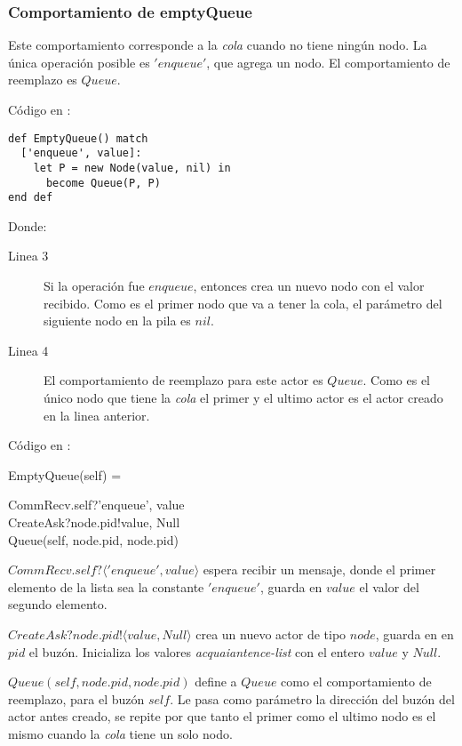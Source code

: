 \subsubsection*{Comportamiento de emptyQueue}
Este comportamiento corresponde a la \textit{cola} cuando no tiene ningún nodo. La única operación posible es $'enqueue'$, que agrega un nodo. El comportamiento de reemplazo es $Queue$.

Código en \SAL:

\begin{lstlisting}[language=sal, style=simple]
def EmptyQueue() match
  ['enqueue', value]:
    let P = new Node(value, nil) in
      become Queue(P, P)
end def
\end{lstlisting}

Donde:

\begin{description}
 \item [Linea 3] Si la operación fue $enqueue$, entonces crea un nuevo nodo con el valor recibido. Como es el primer nodo que va a tener la cola, el parámetro del siguiente nodo en la pila es $nil$.
 \item [Linea 4] El comportamiento de reemplazo para este actor es $Queue$. Como es el único nodo que tiene la \textit{cola} el primer y el ultimo actor es el actor creado en la linea anterior.
\end{description}

Código en \CSP:

\begin{process}
EmptyQueue(self) = \\ \quad
  \begin{block}
  CommRecv.self?\langle 'enqueue', value \rangle \then \\ 
  CreateAsk?node.pid!\langle value, Null\rangle \then \\
  Queue(self, node.pid, node.pid)
  \end{block}
\end{process}

\begin{description}
 \item $CommRecv.self?\langle 'enqueue', value \rangle$ espera recibir un mensaje, donde el primer elemento de la lista sea la constante $'enqueue'$, guarda en $value$ el valor del segundo elemento.
 \item $CreateAsk?node.pid!\langle value, Null \rangle$ crea un nuevo actor de tipo $node$, guarda en en $pid$ el buzón. Inicializa los valores \textit{acquaiantence-list} con el entero $value$ y $Null$.
 \item $Queue(self, node.pid, node.pid)$ define a $Queue$ como el comportamiento de reemplazo, para el buzón $self$. Le pasa como parámetro la dirección del buzón del actor antes creado, se repite por que tanto el primer como el ultimo nodo es el mismo cuando la \textit{cola} tiene un solo nodo.
\end{description}

